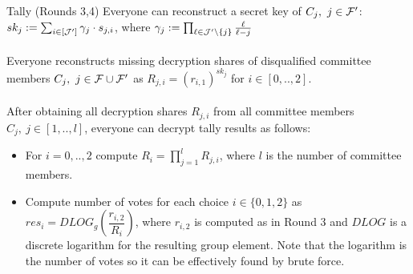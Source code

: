 \begin{boxfig}{\label{fig:tally2}Tally (Rounds 3,4)}{}
Everyone can reconstruct a secret key of $C_j,\ j\in\mathcal{F}'$: $sk_j := \sum_{i\in[\mathcal{J}']} \gamma_{j} \cdot s_{j,i}$, where $\gamma_{j}:= \prod_{\ell\in \mathcal{J}'\setminus \{j\} } \frac{\ell}{\ell-j}$\\\\
Everyone reconstructs missing decryption shares of disqualified committee members $C_j,\ j\in\FFF\cup\FFF'$ as $R_{j,i}=(r_{i,1})^{sk_j}$ for $i\in[0,..,2]$.\\\\
After obtaining all decryption shares $R_{j,i}$ from all committee members $C_j,\ j\in[1,..,l]$, everyone can decrypt tally results as follows:
\begin{itemize}
    \item For $i = 0,.., 2$ compute $R_i=\prod_{j=1}^{l} R_{j,i}$, where $l$ is the number of committee members.
    \item Compute number of votes for each choice $i\in\{0,1,2\}$ as $res_{i}=DLOG_g(\dfrac{r_{i,2}}{R_i})$, where $r_{i,2}$ is computed as in Round 3 and $DLOG$ is a discrete logarithm for the resulting group element. Note that the logarithm is the number of votes so it can be effectively found by brute force.\\
\end{itemize}
\end{boxfig}

